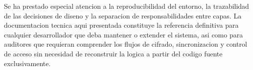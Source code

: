 \documentclass[11pt, a4paper]{article}
\begin{document}
Se ha prestado especial atencion a la reproducibilidad del entorno, la trazabilidad de las decisiones de diseno y la separacion de responsabilidades entre capas. La documentacion tecnica aqui presentada constituye la referencia definitiva para cualquier desarrollador que deba mantener o extender el sistema, asi como para auditores que requieran comprender los flujos de cifrado, sincronizacion y control de acceso sin necesidad de reconstruir la logica a partir del codigo fuente exclusivamente.
\end{document}
